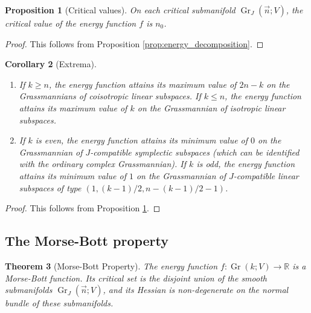 \documentclass[12pt, final]{article}
\def\R{\mathbb{R}}
\def\Gr{\operatorname{Gr}}
\newtheorem{theorem}{Theorem}[section]
\newtheorem{proposition}[theorem]{Proposition}
\newtheorem{corollary}[theorem]{Corollary}
\begin{document}
\begin{proposition}[Critical values]
\label{prop:critical_values}
On each critical submanifold $\Gr_J(\vec{n}; V)$, the critical value of the energy function $f$ is $n_0$.
\end{proposition}
\begin{proof}
This follows from Proposition \ref{prop:energy_decomposition}.
\end{proof}

\begin{corollary}[Extrema]\
\begin{enumerate}
\item If $k \ge n$, the energy function attains its maximum value of $2n-k$ on the Grassmannians of coisotropic linear subspaces. If $k \le n$, the energy function attains its maximum value of $k$ on the Grassmannian of isotropic linear subspaces.
\item If $k$ is even, the energy function attains its minimum value of $0$ on the Grassmannian of $J$-compatible symplectic subspaces (which can be identified with the ordinary complex Grassmannian). If $k$ is odd, the energy function attains its minimum value of $1$ on the Grassmannian of $J$-compatible linear subspaces of type $(1, (k-1)/2, n-(k-1)/2 - 1)$.
\end{enumerate}
\end{corollary}
\begin{proof}
This follows from Proposition \ref{prop:critical_values}.
\end{proof}

\subsection{The Morse-Bott property} \label{subsec:morse_bott}

\begin{theorem}[Morse-Bott Property]\label{thm:morse_bott}
The energy function $f: \Gr(k; V) \to \R$ is a Morse-Bott function. Its critical set is the disjoint union of the smooth submanifolds $\Gr_J(\vec{n}; V)$, and its Hessian is non-degenerate on the normal bundle of these submanifolds.
\end{theorem}
\end{document}
